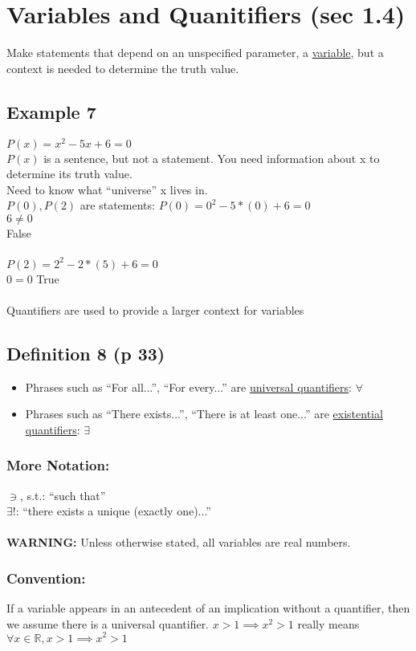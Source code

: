 \documentclass{article}
\begin{document}
\section{Variables and Quanitifiers (sec 1.4)}
Make statements that depend on an unspecified parameter, a \underline{variable}, but a context is needed to determine the truth value.
\subsection{Example 7}
$P(x) = x^2 - 5x + 6 = 0$\\
$P(x)$ is a sentence, but not a statement. You need information about x to determine its truth value.\\
Need to know what ``universe'' x lives in.\\
$P(0), P(2)$ are statements:
$P(0) = 0^2 - 5*(0) + 6 = 0$\\
$6 \not= 0$\\
False\\\\
$P(2) = 2^2 - 2*(5) + 6 = 0$\\
$0 = 0$
True\\\\
Quantifiers are used to provide a larger context for variables\\
\subsection{Definition 8 (p 33)}
\begin{itemize}
	\item Phrases such as ``For all...'', ``For every...'' are \underline{universal quantifiers}: $\forall$
	\item Phrases such as ``There exists...'', ``There is at least one...'' are \underline{existential quantifiers}: $\exists$
\end{itemize}
\subsubsection{More Notation:}
$\ni$, s.t.: ``such that''\\
$\exists !$: ``there exists a unique (exactly one)...''\\\\

\textbf{WARNING:} Unless otherwise stated, all variables are real numbers.
\subsubsection{Convention:}
If a variable appears in an antecedent of an implication without a quantifier, then we assume there is a universal quantifier. $x > 1 \implies x^2 > 1$ really means $\forall x \in \mathbb{R}, x > 1 \implies x^2 > 1$
\end{document}
